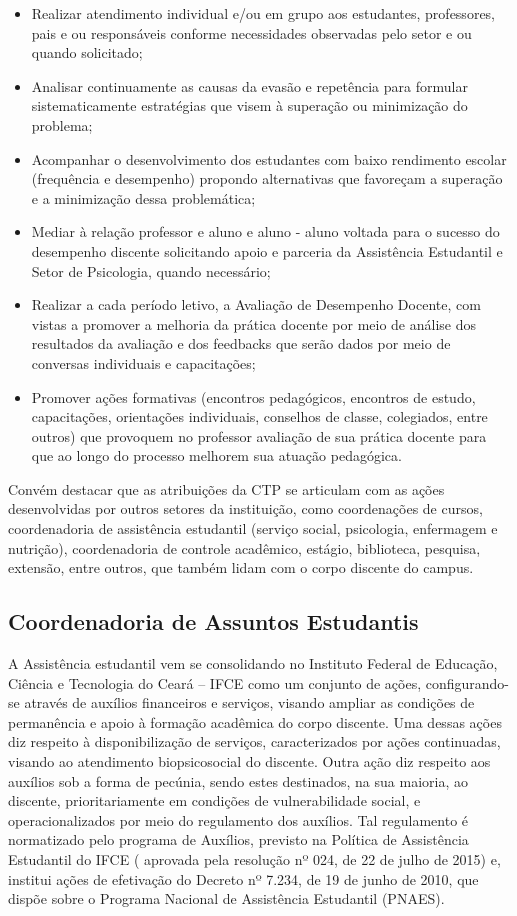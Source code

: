 \documentclass{paper}
\begin{document}
\begin{itemize}
\item Realizar atendimento individual e/ou em grupo aos estudantes, professores, pais e ou responsáveis conforme necessidades observadas pelo setor e ou quando solicitado;
\item Analisar continuamente as causas da evasão e repetência para formular sistematicamente estratégias que visem à superação ou minimização do problema;
\item Acompanhar o desenvolvimento dos estudantes com baixo rendimento escolar (frequência e desempenho) propondo alternativas que favoreçam a superação e a minimização dessa problemática;
\item Mediar à relação professor e aluno e aluno - aluno voltada para o sucesso do desempenho discente solicitando apoio e parceria da Assistência Estudantil e Setor de Psicologia, quando necessário;
\item Realizar a cada período letivo, a Avaliação de Desempenho Docente, com vistas a promover a melhoria da prática docente por meio de análise dos resultados da avaliação e dos feedbacks que serão dados por meio de conversas individuais e capacitações;
\item Promover ações formativas (encontros pedagógicos, encontros de estudo, capacitações, orientações individuais, conselhos de classe, colegiados, entre outros) que provoquem no professor avaliação de sua prática docente para que ao longo do processo melhorem sua atuação pedagógica.
\end{itemize}

Convém destacar que as atribuições da CTP se articulam com as ações desenvolvidas por outros setores da instituição, como coordenações de cursos, coordenadoria de assistência estudantil (serviço social, psicologia, enfermagem e nutrição), coordenadoria de controle acadêmico, estágio, biblioteca, pesquisa, extensão, entre outros, que também lidam com o corpo discente do campus.

\subsection{Coordenadoria de Assuntos Estudantis}

A Assistência estudantil vem se consolidando no Instituto Federal de Educação, Ciência e Tecnologia do Ceará – IFCE como um conjunto de ações, configurando-se através de auxílios financeiros e serviços, visando ampliar as condições de permanência e apoio à formação acadêmica do corpo discente. Uma dessas ações diz respeito à disponibilização de serviços, caracterizados por ações continuadas, visando ao atendimento biopsicosocial do discente. Outra ação diz respeito aos auxílios sob a forma de pecúnia, sendo estes destinados, na sua maioria, ao discente, prioritariamente em condições de vulnerabilidade social, e operacionalizados por meio do regulamento dos auxílios. Tal regulamento é normatizado pelo programa de Auxílios, previsto na Política de Assistência Estudantil do IFCE ( aprovada pela resolução nº 024, de 22 de julho de 2015) e, institui ações de efetivação do Decreto nº 7.234, de 19 de junho de 2010, que dispõe sobre o Programa Nacional de Assistência Estudantil (PNAES).
 
\end{document}
